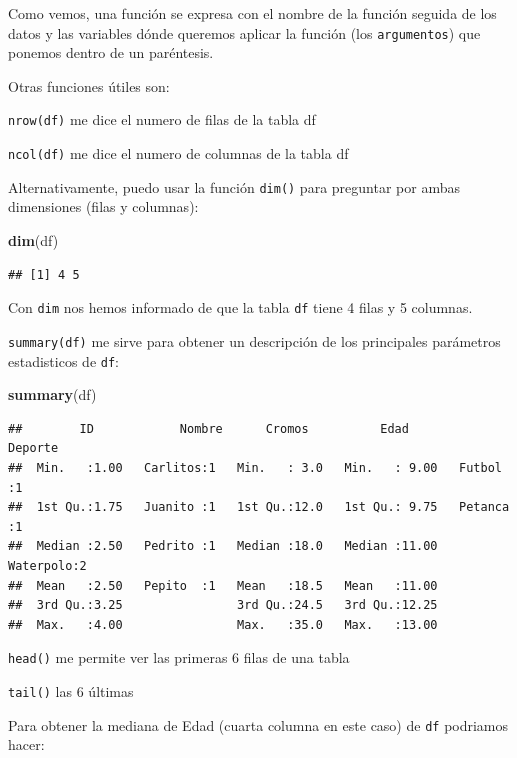 \documentclass[]{book}
\newenvironment{Shaded}{\begin{snugshade}}{\end{snugshade}}
\newcommand{\KeywordTok}[1]{\textcolor[rgb]{0.13,0.29,0.53}{\textbf{{#1}}}}
\newcommand{\NormalTok}[1]{{#1}}
\theoremstyle{definition}
\theoremstyle{definition}
\theoremstyle{remark}
\begin{document}
Como vemos, una función se expresa con el nombre de la función seguida
de los datos y las variables dónde queremos aplicar la función (los
\texttt{argumentos}) que ponemos dentro de un paréntesis.

Otras funciones útiles son:

\texttt{nrow(df)} me dice el numero de filas de la tabla df

\texttt{ncol(df)} me dice el numero de columnas de la tabla df

Alternativamente, puedo usar la función \texttt{dim()} para preguntar
por ambas dimensiones (filas y columnas):

\begin{Shaded}
\begin{Highlighting}[]
\KeywordTok{dim}\NormalTok{(df)}
\end{Highlighting}
\end{Shaded}

\begin{verbatim}
## [1] 4 5
\end{verbatim}

Con \texttt{dim} nos hemos informado de que la tabla \texttt{df} tiene 4
filas y 5 columnas.

\texttt{summary(df)} me sirve para obtener un descripción de los
principales parámetros estadisticos de \texttt{df}:

\begin{Shaded}
\begin{Highlighting}[]
\KeywordTok{summary}\NormalTok{(df)}
\end{Highlighting}
\end{Shaded}

\begin{verbatim}
##        ID            Nombre      Cromos          Edad            Deporte 
##  Min.   :1.00   Carlitos:1   Min.   : 3.0   Min.   : 9.00   Futbol   :1  
##  1st Qu.:1.75   Juanito :1   1st Qu.:12.0   1st Qu.: 9.75   Petanca  :1  
##  Median :2.50   Pedrito :1   Median :18.0   Median :11.00   Waterpolo:2  
##  Mean   :2.50   Pepito  :1   Mean   :18.5   Mean   :11.00                
##  3rd Qu.:3.25                3rd Qu.:24.5   3rd Qu.:12.25                
##  Max.   :4.00                Max.   :35.0   Max.   :13.00
\end{verbatim}

\texttt{head()} me permite ver las primeras 6 filas de una tabla

\texttt{tail()} las 6 últimas

Para obtener la mediana de Edad (cuarta columna en este caso) de
\texttt{df} podriamos hacer:
\end{document}
